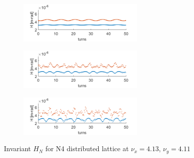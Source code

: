 \begin{figure}[!htb]
	\begin{subfigure}[]{0.5\textwidth} \centering 
    \includegraphics*[width=174pt]{6.figures/Ioct=0_F09385_D09435}
	\end{subfigure}
	\begin{subfigure}[]{0.5\textwidth} \centering
    \includegraphics*[width=174pt]{6.figures/Ioct=2_F09385_D09435}
	\end{subfigure}
	\begin{subfigure}[]{0.5\textwidth} \centering
    \includegraphics*[width=174pt]{6.figures/Ioct=4_F09385_D09435}
	\end{subfigure}
 	\caption{Invariant $H_N$ for N4 distributed lattice at $\nu_x=4.13$, $\nu_y=4.11$}
   \label{N4invar2}
\end{figure}



